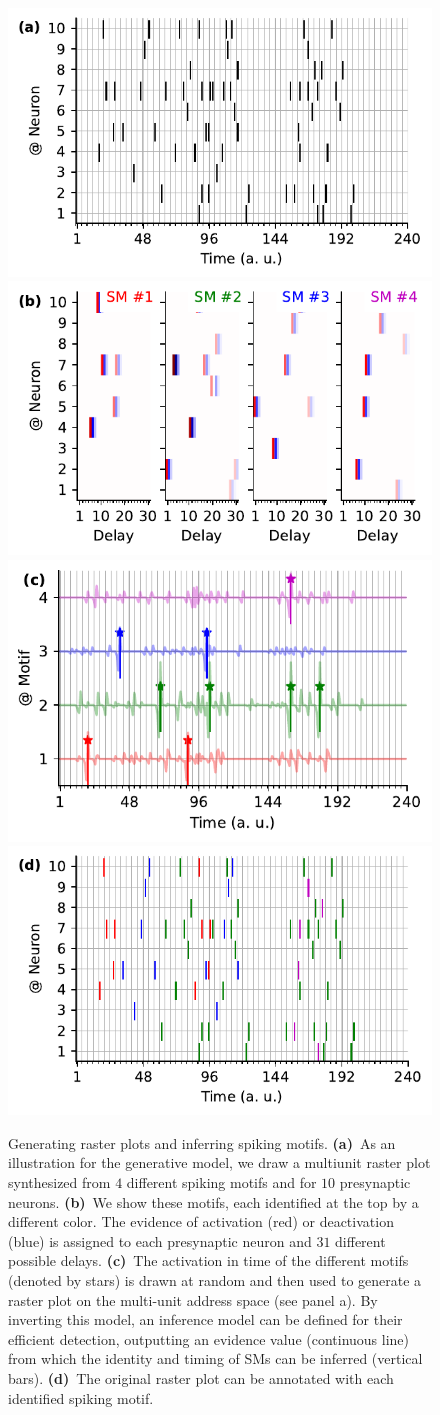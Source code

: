 \documentclass[runningheads]{llncs}
\begin{document}
\begin{figure}[t]%
  \includegraphics[width=.50\linewidth]{figures/THC_toy-a_k.pdf}
  \includegraphics[width=.50\linewidth]{figures/THC_toy-b.pdf}\\
  \includegraphics[width=.50\linewidth]{figures/THC_toy-c.pdf}
  \includegraphics[width=.50\linewidth]{figures/THC_toy-a.pdf} 

\caption{Generating raster plots and inferring spiking motifs. \textbf{(a)}~As an illustration for the generative model, we draw a multiunit raster plot synthesized from $4$ different spiking motifs and for $10$ presynaptic neurons. \textbf{(b)}~We show these motifs, each identified at the top by a different color. The evidence of activation (red) or deactivation (blue) is assigned to each presynaptic neuron and $31$ different possible delays. \textbf{(c)}~The activation in time of the different motifs (denoted by stars) is drawn at random and then used to generate a raster plot on the multi-unit address space (see panel a). By inverting this model, an inference model can be defined for their efficient detection, outputting an evidence value (continuous line) from which the identity and timing of SMs can be inferred (vertical bars). \textbf{(d)}~The original raster plot can be annotated with each identified spiking motif.
}
\label{fig:THC}
\end{figure}
\end{document}
